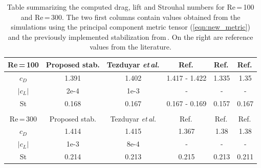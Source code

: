 \begin{table}[htbp]
	\centering
	\begin{tabular}{c | c c c c c}
		Re\,=\,100 & Proposed stab. & Tezduyar \textit{et\,al.} & Ref.\,\cite{Tezduyar2000} & Ref.\,\cite{Rajani2009} & Ref.\,\cite{Main2018} \\
		\midrule
		$c_D$      & 1.391          & 1.402                     & 1.417 - 1.422             & 1.335                   & 1.35                  \\
		$|c_L|$      & 2e-4           & 1e-3                      & -                         & -                       & -                     \\
		St         & 0.168          & 0.167                     & 0.167 - 0.169             & 0.157                   & 0.167                 \\
		           &                &                           &                           &                         &                       \\[-1em]
		\midrule
		Re\,=\,300 & Proposed stab. & Tezduyar \textit{et\,al.} & Ref.\,\cite{Rajani2009}   & Ref.\,\cite{mittal1997} & Ref.\,\cite{Main2018} \\
		\midrule
		$c_D$      & 1.414          & 1.415                     & 1.367                     & 1.38                    & 1.38                  \\
		$|c_L|$      & 1e-3           & 8e-4                      & -                         & -                       & -                     \\
		St         & 0.214          & 0.213                     & 0.215                     & 0.213                   & 0.211                 \\
	\end{tabular}
	\caption[Drag, lift and St of the cylinder at Re\,=\,100 and Re\,=\,300]{Table summarizing the computed drag, lift and Strouhal numbers for Re\,=\,100 and Re\,=\,300. The two first columns contain values obtained from the simulations using the principal component metric tensor (\autoref{eqn:new_metric}) and the previously implemented stabilization from\,\cite{Tezduyar2000}. On the right are reference values from the literature.}\label{tab:DragLiftStrouhal}
\end{table}

